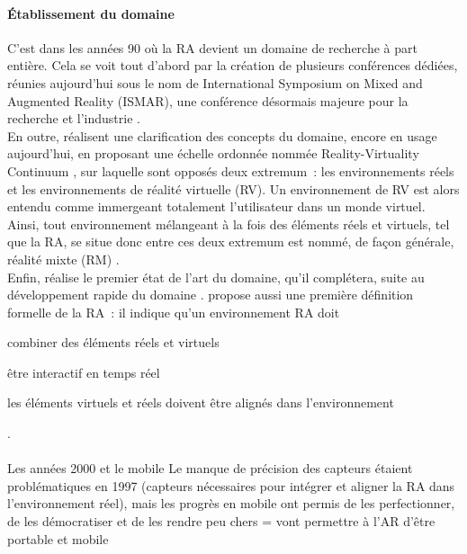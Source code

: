 \paragraph*{Établissement du domaine}
C'est dans les années 90 où la RA devient un domaine de recherche à part entière. Cela se voit tout d'abord par la création de plusieurs conférences dédiées, réunies aujourd'hui sous le nom de International Symposium on Mixed and Augmented Reality (ISMAR), une conférence désormais majeure pour la recherche et l'industrie \citep{AzumaBaillotBehringerEtAl2001}.\\
En outre, \citet{MilgramKishino1994} réalisent une clarification des concepts du domaine, encore en usage aujourd'hui, en proposant une échelle ordonnée nommée \foreignlanguage{english}{Reality-Virtuality Continuum} , sur laquelle sont opposés deux extremum~: les environnements réels et les environnements de réalité virtuelle (RV). Un environnement de RV est alors entendu comme immergeant totalement l'utilisateur dans un monde virtuel. Ainsi, tout environnement mélangeant à la fois des éléments réels et virtuels, tel que la RA, se situe donc entre ces deux extremum est nommé, de façon générale, réalité mixte (RM) \citep{MilgramKishino1994}.\\
Enfin, \citet{Azuma1997} réalise le premier état de l'art du domaine, qu'il complétera, suite au développement rapide du domaine \citet{AzumaBaillotBehringerEtAl2001}. \citet{Azuma1997} propose aussi une première définition formelle de la RA~: il indique qu'un environnement RA doit 
\begin{enumerate*}[label=\emph{\arabic*})]
\item combiner des éléments réels et virtuels
\item être interactif en temps réel
\item les éléments virtuels et réels doivent être alignés dans l'environnement
\end{enumerate*}.

\paragraph*{}
Les années 2000 et le mobile \cite{HuangHuiPeyloEtAl2013}
Le manque de précision des capteurs étaient problématiques en 1997 \citep{Azuma1997} (capteurs nécessaires pour intégrer et aligner la RA dans l'environnement réel), mais les progrès en mobile ont permis de les perfectionner, de les démocratiser et de les rendre peu chers = vont permettre à l'AR d'être portable et mobile \cite{VanKrevelenPoelman2010}

